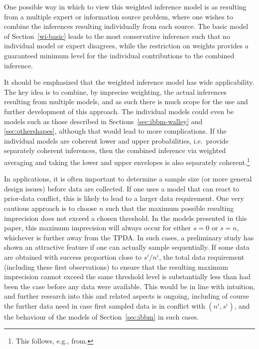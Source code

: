 One possible way in which to view this weighted inference model is
as resulting from a multiple expert or information source problem,
where one wishes to combine the inferences resulting individually
from each source. The basic model of Section~\ref{wi-basic} leads to
the most conservative inference such that no individual model or
expert disagrees, while the restriction on weights provides a
guaranteed minimum level for the individual contributions to the combined
inference.

It should be emphasized that the weighted inference model has wide applicability.
The key idea is to combine,
by imprecise weighting, the actual inferences resulting from
multiple models, and as such there is much scope for the use and
further development of this approach. The individual models could
even be models such as those described in
Sections~\ref{sec:ibbm-walley} and \ref{sec:othershapes}, although
that would lead to more complications. If the individual models
are coherent lower and upper probabilities, i.e.\ provide separately
coherent inferences, then the combined inference via weighted
averaging and taking the lower and upper envelopes is also
separately coherent.\footnote{This follows, e.g., from\textcite[\S 2.6.3f]{1991:walley}.}

In applications, it is often important to determine a sample size
(or more general design issues) before data are collected. If one
uses a model that can react to prior-data conflict, this is likely
to lead to a larger data requirement. One very cautious approach is to choose $n$ such that the maximum possible resulting
imprecision does not exceed a chosen threshold. In the models
presented in this paper, this maximum imprecision will always occur
for either $s=0$ or $s=n$, whichever is further away from the TPDA.
In such cases, a preliminary study has shown an attractive feature if one can actually
sample sequentially. If some data are obtained with success proportion close to $s^i/n^i$, %
the total data requirement (including these first observations) %
to ensure that the resulting maximum
imprecision cannot exceed the same threshold level is substantially less
than had been the case before any data were available.
This would be in line with intuition, and further
research into this and related aspects is ongoing, including of
course the further data need in case first sampled data is in
conflict with $(n^i,s^i)$, and the behaviour of the models of Section~\ref{sec:ibbm} in such cases.


